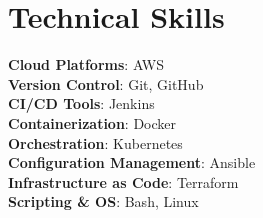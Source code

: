 \documentclass[letterpaper,11pt]{article}
\begin{document}
\section{Technical Skills}
 \begin{itemize}[leftmargin=0.15in, label={}]
    \small{\item{
     \textbf{Cloud Platforms}{:\hspace{1.92cm}  AWS} \\
     \textbf{Version Control}{:\hspace{2.05cm}   Git, GitHub } \\
     \textbf{CI/CD Tools}{:\hspace{2.55cm} Jenkins} \\
     \textbf{Containerization}{:\hspace{1.95cm} Docker } \\
     \textbf{Orchestration}{:\hspace{2.45cm} Kubernetes}\\
     \textbf{Configuration Management}{:\hspace{0.02cm} Ansible} \\
     \textbf{Infrastructure as Code}{:\hspace{0.80cm} Terraform} \\
     \textbf{Scripting \& OS}{:\hspace{2.15cm} Bash, Linux} \\
     
    }}
 \end{itemize}

\end{document}
